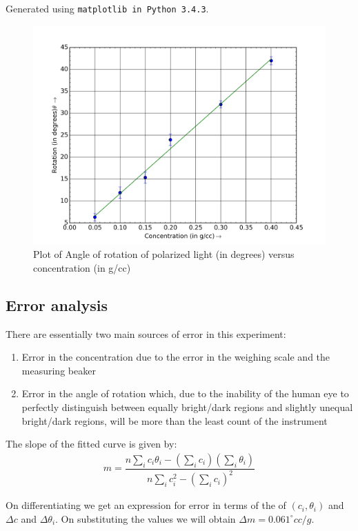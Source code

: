 \documentclass{dkpinto-report}
\begin{document}
Generated using \texttt{matplotlib in Python 3.4.3}.
\begin{figure}[ht]
\centering
\includegraphics[scale=0.7]{Images/Plot.png}
\caption{Plot of Angle of rotation of polarized light (in degrees) versus concentration (in g/cc)} 
\end{figure}


\subsection{Error analysis}
There are essentially two main sources of error in this experiment:
\begin{enumerate}
\item Error in the concentration due to the error in the weighing scale and the measuring beaker
\item Error in the angle of rotation which, due to the inability of the human eye to perfectly distinguish between equally bright/dark regions and slightly unequal bright/dark regions, will be more than the least count of the instrument
\end{enumerate} 

The slope of the fitted curve is given by:
\begin{align*}
m = \dfrac{n\sum_i c_i \theta_i - (\sum_i c_i)(\sum_i \theta_i)}{n\sum_i c_{i}^{2} -  (\sum_i c_i)^2}
\end{align*}

On differentiating we get an expression for error in terms of the of $(c_i, \theta_i)$ and $\Delta c$ and $\Delta \theta_i$. On substituting the values we will obtain $\Delta m = 0.061 ^{\circ} cc / g$. 
\end{document}
